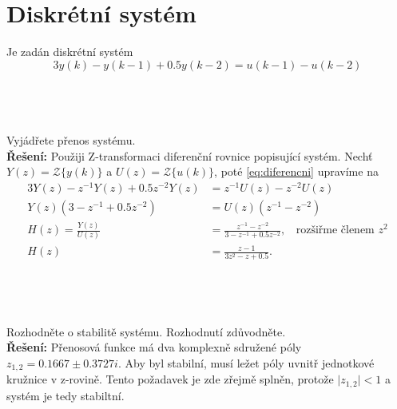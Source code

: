 \documentclass[twoside]{article}
\begin{document}
\section{Diskrétní systém}
\label{sec:ukol10}
Je zadán diskrétní systém
\begin{equation}
	\label{eq:diferencni}
	3y(k) - y(k-1) + 0.5 y(k-2) = u(k-1)-u(k-2)
\end{equation}

\subsection{~}
Vyjádřete přenos systému. \\
\textbf{Řešení:} Použiji Z-transformaci diferenční rovnice popisující systém. Nechť $Y(z) = \mathcal{Z}\{y(k)\}$ a $U(z) = \mathcal{Z}\{u(k)\}$, poté \eqref{eq:diferencni} upravíme na
\begin{equation}
	\begin{split}
		3Y(z) - z^{-1} Y(z) + 0.5 z^{-2} Y(z) &= z^{-1}U(z) - z^{-2}U(z) \\
		Y(z) (3- z^{-1} + 0.5 z^{-2}) &= U(z) (z^{-1} - z^{-2}) \\
		H(z) = \frac{Y(z)}{U(z)} &= \frac{z^{-1} - z^{-2}}{3-z^{-1}+ 0.5z^{-2}}, ~~~~\text{rozšiřme členem $z^2$} \\
		H(z) &= \frac{z - 1}{3z^2-z+ 0.5}.
	\end{split}
\end{equation}

\subsection{~}
Rozhodněte o stabilitě systému. Rozhodnutí zdůvodněte. \\
\textbf{Řešení:} Přenosová funkce má dva komplexně sdružené póly $ z_{1,2} = 0.1667 \pm 0.3727i$. Aby byl stabilní, musí ležet póly uvnitř jednotkové kružnice v z-rovině.
Tento požadavek je zde zřejmě splněn, protože $\vert z_{1,2} \vert < 1 $ a systém je tedy stabiltní.
\end{document}
